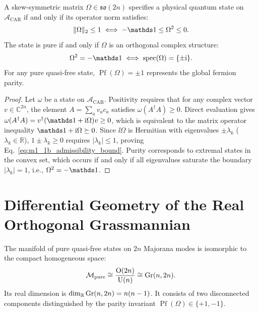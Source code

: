 \begin{theorem}
\label{thm:m1_1b_admissibility}
A skew-symmetric matrix $\Omega \in \mathfrak{so}(2n)$ specifies a physical quantum state on $\mathcal{A}_{\mathrm{CAR}}$ if and only if its operator norm satisfies:
\begin{equation}
\label{eq:m1_1b_admissibility_bound}
\|\Omega\|_2 \le 1 \iff -\Id \le \Omega^2 \le 0.
\end{equation}
The state is pure if and only if $\Omega$ is an orthogonal complex structure:
\begin{equation}
\label{eq:m1_1b_purity_condition}
\Omega^2 = -\Id \iff \operatorname{spec}(\Omega) = \{\pm \ii\}.
\end{equation}
For any pure quasi-free state, $\operatorname{Pf}(\Omega) = \pm 1$ represents the global fermion parity.
\end{theorem}
\begin{proof}
Let $\omega$ be a state on $\mathcal{A}_{\mathrm{CAR}}$. Positivity requires that for any complex vector $v \in \mathbb{C}^{2n}$, the element $A = \sum_a v_a c_a$ satisfies $\omega(A^\dagger A) \ge 0$. Direct evaluation gives $\omega(A^\dagger A) = v^\dagger (\Id + \ii\Omega) v \ge 0$, which is equivalent to the matrix operator inequality $\Id + \ii\Omega \succeq 0$. Since $\ii\Omega$ is Hermitian with eigenvalues $\pm \lambda_k$ ($\lambda_k \in \mathbb{R}$), $1 \pm \lambda_k \ge 0$ requires $|\lambda_k| \le 1$, proving Eq.~\eqref{eq:m1_1b_admissibility_bound}. Purity corresponds to extremal states in the convex set, which occurs if and only if all eigenvalues saturate the boundary $|\lambda_k| = 1$, i.e., $\Omega^2 = -\Id$.
\end{proof}

\section{Differential Geometry of the Real Orthogonal Grassmannian}
\label{sec:m1_1b_grassmannian_geometry}

\begin{definition}
\label{def:m1_1b_grassmannian}
The manifold of pure quasi-free states on $2n$ Majorana modes is isomorphic to the compact homogeneous space:
\begin{equation}
\label{eq:m1_1b_grassmannian_manifold}
\mathcal{M}_{\mathrm{pure}} \cong \frac{\mathrm{O}(2n)}{\mathrm{U}(n)} \cong \operatorname{Gr}(n, 2n).
\end{equation}
Its real dimension is $\dim_{\mathbb{R}} \operatorname{Gr}(n, 2n) = n(n-1)$. It consists of two disconnected components distinguished by the parity invariant $\operatorname{Pf}(\Omega) \in \{+1, -1\}$.
\end{definition}

